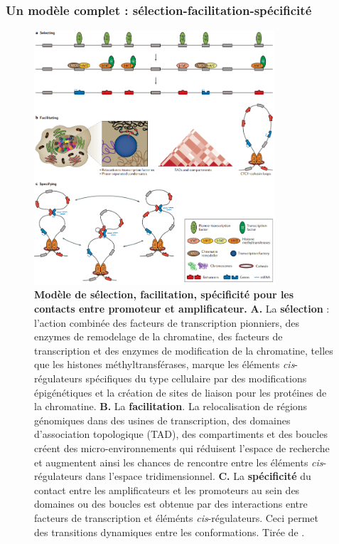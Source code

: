 \subsubsection{Un modèle complet : sélection-facilitation-spécificité}
\label{subsubsec:modele-complet}

\begin{figure}[H]
    \centering
    \includegraphics[width=0.8\textwidth, page=1] {figures/introduction/fig14.png}
    \caption[Modèle de sélection, facilitation, spécificité pour les contacts entre promoteur et amplificateur.]{
    \textbf{Modèle de sélection, facilitation, spécificité pour les contacts entre promoteur et amplificateur.}
    \textbf{A.} La \textbf{sélection} : l'action combinée des facteurs de transcription pionniers, des enzymes de remodelage de la chromatine, des facteurs de transcription et des enzymes de modification de la chromatine, telles que les histones méthyltransférases, marque les éléments \textit{cis}-régulateurs spécifiques du type cellulaire par des modifications épigénétiques et la création de sites de liaison pour les protéines de la chromatine. \textbf{B.} La \textbf{facilitation}. La relocalisation de régions génomiques dans des usines de transcription, des domaines d'association topologique (TAD), des compartiments et des boucles créent des micro-environnements qui réduisent l'espace de recherche et augmentent ainsi les chances de rencontre entre les éléments \textit{cis}-régulateurs dans l'espace tridimensionnel. \textbf{C.} La \textbf{spécificité} du contact entre les amplificateurs et les promoteurs au sein des domaines ou des boucles est obtenue par des interactions entre facteurs de transcription et éléménts \textit{cis}-régulateurs. Ceci permet des transitions dynamiques entre les conformations.
    Tirée de \citep{schoenfelder_long-range_2019}.\\
    }
    \label{fig:Fig14}
\end{figure}


